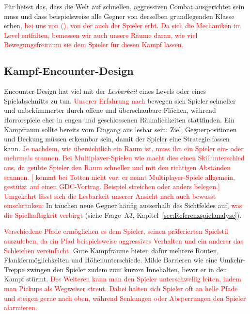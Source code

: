 \documentclass[../Main.tex]{subfiles}
\begin{document}
Für  heisst das, dass die Welt auf schnellen, aggressiven Combat ausgerichtet sein muss und dass beispielsweise alle Gegner von derselben grundlegenden Klasse erben\textcolor{red}{, bei uns von  (), von der auch der Spieler erbt}. \textcolor{red}{Da sich die Mechaniken im Level entfalten, bemessen wir auch unsere Räume daran, wie viel Bewegungsfreiraum sie dem Spieler für diesen Kampf lassen.}

\subsection{Kampf-Encounter-Design} \label{sec:Encounter}
Encounter-Design hat viel mit der \textit{Lesbarkeit} eines Levels oder eines Spielabschnitts zu tun. \textcolor{red}{Unserer Erfahrung nach} bewegen sich Spieler schneller und unbekümmerter durch offene und überschaubare Flächen, während Horrorspiele eher in engen und geschlossenen Räumlichkeiten stattfinden. Ein Kampfraum sollte bereits vom Eingang aus lesbar sein: Ziel, Gegnerpositionen und Deckung müssen erkennbar sein, damit der Spieler eine Strategie fassen kann.\autocite{gdc_horizonquests2018} \textcolor{red}{Je nachdem, wie übersichtlich ein Raum ist, muss ihn ein Spieler ein- oder mehrmals scannen. Bei Multiplayer-Spielen wie \autocite{valve_counterstrike_2000} macht dies einen Skillunterschied aus, da geübte Spieler den Raum schneller und mit den richtigen Abständen scannen.\autocite[122--123]{totten2014architectural} \textcolor{red}{[ kommt bei Totten nicht vor; er nennt Multiplayer-Spiele allgemein, gestützt auf einen GDC-Vortrag. Beispiel streichen oder anders belegen.]}} \textcolor{red}{Umgekehrt lässt sich die Lesbarkeit unserer Ansicht nach auch bewusst einschränken:} In  tauchen neue Gegner häufig ausserhalb des Sichtfeldes auf, \textcolor{red}{was die Spielhaftigkeit verbirgt} (siehe Frage~A3, Kapitel~\ref{sec:Referenzspielanalyse}).

\textcolor{red}{Verschiedene Pfade ermöglichen es dem Spieler, seinen präferierten Spielstil auszuleben, da ein Pfad beispielsweise aggressives Verhalten und ein anderer das Schleichen vereinfacht.\autocite{gdc_tenprinciples2010}} Gute Kampfräume bieten dafür mehrere Routen, Flankiermöglichkeiten und Höhenunterschiede. Milde Barrieren wie eine Umkehr-Treppe zwingen den Spieler zudem zum kurzen Innehalten, bevor er in den Kampf stürmt.\autocite{gdc_horizonquests2018} \textcolor{red}{Des Weiteren kann man den Spieler unterschwellig leiten, indem man Pickups als Wegweiser streut. Dabei halten sich Spieler oft an helle Pfade und steigen gerne nach oben, während Senkungen oder Absperrungen den Spieler alarmieren.\autocite[240, 245, 251]{rogers2014levelup}}
\end{document}
